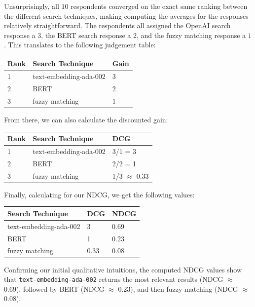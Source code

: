 \documentclass[
	a4paper, %
	10pt, %
	unnumberedsections, %
	twoside, %
]{LTJournalArticle}
\begin{document}
Unsurprisingly, all $10$ respondents converged on the exact same ranking between the different search techniques, making computing the averages for the responses relatively straightforward. The respondents all assigned the OpenAI search response a $3$, the BERT search response a $2$, and the fuzzy matching response a $1$. This translates to the following judgement table:
\begin{center}
	\begin{tabular}{lll}
		\toprule
		Rank & Search Technique & Gain \\
		\midrule
		1 & text-embedding-ada-002 & 3 \\
		2 & BERT & 2 \\
		3 & fuzzy matching & 1 \\
		\bottomrule
	\end{tabular}
\end{center}

From there, we can also calculate the discounted gain: 

\begin{center}
	\begin{tabular}{lll}
		\toprule
		Rank & Search Technique  & DCG \\
		\midrule
		1 & text-embedding-ada-002 & 3/1 = 3 \\
		2 & BERT & 2/2 = 1 \\
		3 & fuzzy matching & 1/3 $\approx$ 0.33 \\
		\bottomrule
	\end{tabular}	
\end{center}

Finally, calculating for our NDCG, we get the following values: 

\begin{center}
	\begin{tabular}{lll}
		\toprule
		Search Technique & DCG  & NDCG \\
		\midrule
		text-embedding-ada-002 & 3  & 0.69 \\
		BERT & 1  & 0.23 \\
		fuzzy matching & 0.33  & 0.08 \\
		\bottomrule
	\end{tabular}
\end{center}

Confirming our initial qualitative intuitions, the computed NDCG values show that \texttt{text-embedding-ada-002} returns the most relevant results (NDCG $\approx$ 0.69), followed by BERT (NDCG $\approx$ 0.23), and then fuzzy matching (NDCG $\approx$ 0.08).
\end{document}
